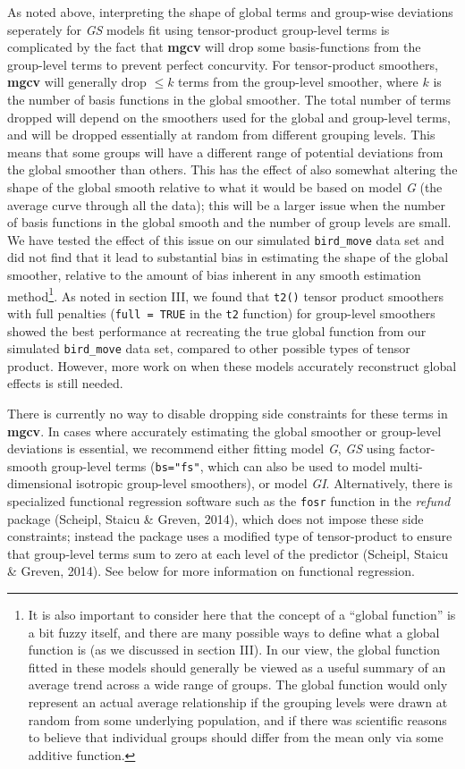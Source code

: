 \documentclass[12pt]{article}
\let\rmarkdownfootnote\footnote%
\def\footnote{\protect\rmarkdownfootnote}
\begin{document}
As noted above, interpreting the shape of global terms and group-wise
deviations seperately for \emph{GS} models fit using tensor-product
group-level terms is complicated by the fact that \textbf{mgcv} will
drop some basis-functions from the group-level terms to prevent perfect
concurvity. For tensor-product smoothers, \textbf{mgcv} will generally
drop \(\le k\) terms from the group-level smoother, where \(k\) is the
number of basis functions in the global smoother. The total number of
terms dropped will depend on the smoothers used for the global and
group-level terms, and will be dropped essentially at random from
different grouping levels. This means that some groups will have a
different range of potential deviations from the global smoother than
others. This has the effect of also somewhat altering the shape of the
global smooth relative to what it would be based on model \emph{G} (the
average curve through all the data); this will be a larger issue when
the number of basis functions in the global smooth and the number of
group levels are small. We have tested the effect of this issue on our
simulated \texttt{bird\_move} data set and did not find that it lead to
substantial bias in estimating the shape of the global smoother,
relative to the amount of bias inherent in any smooth estimation
method\footnote{It is also important to consider here that the concept
  of a ``global function'' is a bit fuzzy itself, and there are many
  possible ways to define what a global function is (as we discussed in
  section III). In our view, the global function fitted in these models
  should generally be viewed as a useful summary of an average trend
  across a wide range of groups. The global function would only
  represent an actual average relationship if the grouping levels were
  drawn at random from some underlying population, and if there was
  scientific reasons to believe that individual groups should differ
  from the mean only via some additive function.}. As noted in section
III, we found that \texttt{t2()} tensor product smoothers with full
penalties (\texttt{full\ =\ TRUE} in the \texttt{t2} function) for
group-level smoothers showed the best performance at recreating the true
global function from our simulated \texttt{bird\_move} data set,
compared to other possible types of tensor product. However, more work
on when these models accurately reconstruct global effects is still
needed.

There is currently no way to disable dropping side constraints for these
terms in \textbf{mgcv}. In cases where accurately estimating the global
smoother or group-level deviations is essential, we recommend either
fitting model \emph{G}, \emph{GS} using factor-smooth group-level terms
(\texttt{bs="fs"}, which can also be used to model multi-dimensional
isotropic group-level smoothers), or model \emph{GI}. Alternatively,
there is specialized functional regression software such as the
\texttt{fosr} function in the \emph{refund} package (Scheipl, Staicu \&
Greven, 2014), which does not impose these side constraints; instead the
package uses a modified type of tensor-product to ensure that
group-level terms sum to zero at each level of the predictor (Scheipl,
Staicu \& Greven, 2014). See below for more information on functional
regression.
\end{document}
